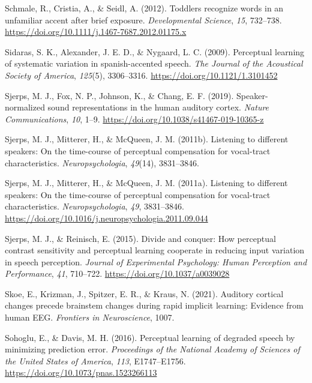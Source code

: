 \documentclass[
  11pt,
  english,
  man,floatsintext]{apa6}
\newlength{\cslhangindent}
\newlength{\cslentryspacingunit} %
\newenvironment{CSLReferences}[2] %
 {%
  \setlength{\parindent}{0pt}
  \ifodd #1
  \let\oldpar\par
  \def\par{\hangindent=\cslhangindent\oldpar}
  \fi
  \setlength{\parskip}{#2\cslentryspacingunit}
 }%
 {}
\begin{document}
\begin{CSLReferences}{1}{0}
\leavevmode{}%
Schmale, R., Cristia, A., \& Seidl, A. (2012). Toddlers recognize words in an unfamiliar accent after brief exposure. \emph{Developmental Science}, \emph{15}, 732--738. \url{https://doi.org/10.1111/j.1467-7687.2012.01175.x}

\leavevmode{}%
Sidaras, S. K., Alexander, J. E. D., \& Nygaard, L. C. (2009). Perceptual learning of systematic variation in spanish-accented speech. \emph{The Journal of the Acoustical Society of America}, \emph{125}(5), 3306--3316. \url{https://doi.org/10.1121/1.3101452}

\leavevmode{}%
Sjerps, M. J., Fox, N. P., Johnson, K., \& Chang, E. F. (2019). Speaker-normalized sound representations in the human auditory cortex. \emph{Nature Communications}, \emph{10}, 1--9. \url{https://doi.org/10.1038/s41467-019-10365-z}

\leavevmode{}%
Sjerps, M. J., Mitterer, H., \& McQueen, J. M. (2011b). Listening to different speakers: On the time-course of perceptual compensation for vocal-tract characteristics. \emph{Neuropsychologia}, \emph{49}(14), 3831--3846.

\leavevmode{}%
Sjerps, M. J., Mitterer, H., \& McQueen, J. M. (2011a). Listening to different speakers: On the time-course of perceptual compensation for vocal-tract characteristics. \emph{Neuropsychologia}, \emph{49}, 3831--3846. \url{https://doi.org/10.1016/j.neuropsychologia.2011.09.044}

\leavevmode{}%
Sjerps, M. J., \& Reinisch, E. (2015). Divide and conquer: How perceptual contrast sensitivity and perceptual learning cooperate in reducing input variation in speech perception. \emph{Journal of Experimental Psychology: Human Perception and Performance}, \emph{41}, 710--722. \url{https://doi.org/10.1037/a0039028}

\leavevmode{}%
Skoe, E., Krizman, J., Spitzer, E. R., \& Kraus, N. (2021). Auditory cortical changes precede brainstem changes during rapid implicit learning: Evidence from human EEG. \emph{Frontiers in Neuroscience}, 1007.

\leavevmode{}%
Sohoglu, E., \& Davis, M. H. (2016). Perceptual learning of degraded speech by minimizing prediction error. \emph{Proceedings of the National Academy of Sciences of the United States of America}, \emph{113}, E1747--E1756. \url{https://doi.org/10.1073/pnas.1523266113}


\end{CSLReferences}
\end{document}
